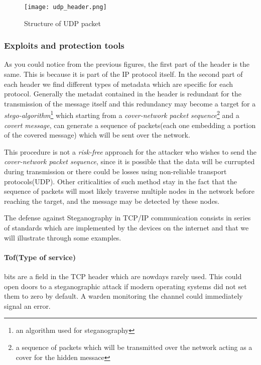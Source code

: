 \documentclass[../../main.tex]{subfiles}
\begin{document}
    \begin{figure}[h]
        \centering
        \caption{Structure of UDP packet}
        \texttt{[image: udp\_header.png]}
    \end{figure}

    \subsubsection{Exploits and protection tools}

    As you could notice from the previous figures, the first part of the header
    is the same. This is because it is part of the IP protocol itself.
    In the second part of each header we find different types of metadata which
    are specific for each protocol. Generally the metadat contained in the
    header is redundant for the transmission of the message itself and this 
    redundancy may become a target for a \emph{stego-algorithm}\footnote{an
    algorithm used for steganography} which starting from a \emph{cover-network
    packet sequence}\footnote{a sequence of packets which will be transmitted
    over the network acting as a cover for the hidden messace} and a
    \emph{covert message}, can generate a sequence of packets(each one embedding
    a portion of the covered message) which will be sent over the network.

    This procedure is not a \emph{risk-free} approach for the attacker who
    wishes to send the \emph{cover-network packet sequence}, since it is
    possible that the data will be currupted during transmission or there could
    be losses using non-reliable transport protocols(UDP).
    Other criticalities of such method stay in the fact that the sequence of
    packets will most likely traverse multiple nodes in the network before
    reaching the target, and the message may be detected by these nodes.

    The defense against Steganography in TCP/IP communication consists in 
    series of standards which are implemented by the devices on the internet and
    that we will illustrate through some examples.


    \paragraph{Tof(Type of service)} bits are a field in the TCP header which
    are nowdays rarely used. This could open doors to a steganographic attack if
    modern operating systems did not set them to zero by default.
    A warden monitoring the channel could immediately signal an error.
\end{document}
